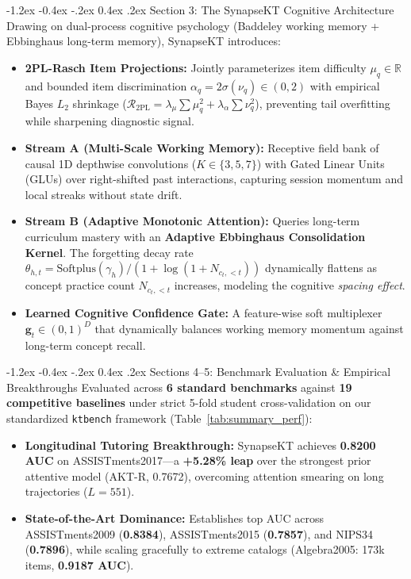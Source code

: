 \documentclass[10.5pt,a4paper]{article}
\makeatletter
\renewcommand{\subsection}{\@startsection{subsection}{2}{\z@}%
  {-1.2ex \@plus -0.4ex \@minus -.2ex}%
  {0.4ex \@plus .2ex}%
  {\normalfont\normalsize\bfseries\color{black}}}
\makeatother
\begin{document}
\subsection{Section 3: The SynapseKT Cognitive Architecture}
Drawing on dual-process cognitive psychology (Baddeley working memory + Ebbinghaus long-term memory), SynapseKT introduces:
\begin{itemize}\setlength{\itemsep}{1.5pt}\setlength{\parskip}{0pt}\setlength{\topsep}{0pt}\setlength{\partopsep}{0pt}
    \item \textbf{2PL-Rasch Item Projections:} Jointly parameterizes item difficulty $\mu_q \in \mathbb{R}$ and bounded item discrimination $\alpha_q = 2\sigma(\nu_q) \in (0, 2)$ with empirical Bayes $L_2$ shrinkage ($\mathcal{R}_{\text{2PL}} = \lambda_\mu \sum \mu_q^2 + \lambda_\alpha \sum \nu_q^2$), preventing tail overfitting while sharpening diagnostic signal.
    \item \textbf{Stream A (Multi-Scale Working Memory):} Receptive field bank of causal 1D depthwise convolutions ($K \in \{3, 5, 7\}$) with Gated Linear Units (GLUs) over right-shifted past interactions, capturing session momentum and local streaks without state drift.
    \item \textbf{Stream B (Adaptive Monotonic Attention):} Queries long-term curriculum mastery with an \textbf{Adaptive Ebbinghaus Consolidation Kernel}. The forgetting decay rate $\theta_{h, t} = \text{Softplus}(\gamma_h) / (1 + \log(1 + N_{c_t, <t}))$ dynamically flattens as concept practice count $N_{c_t, <t}$ increases, modeling the cognitive \textit{spacing effect}.
    \item \textbf{Learned Cognitive Confidence Gate:} A feature-wise soft multiplexer $\mathbf{g}_t \in (0, 1)^D$ that dynamically balances working memory momentum against long-term concept recall.
\end{itemize}

\subsection{Sections 4--5: Benchmark Evaluation \& Empirical Breakthroughs}
Evaluated across \textbf{6 standard benchmarks} against \textbf{19 competitive baselines} under strict 5-fold student cross-validation on our standardized \texttt{ktbench} framework (Table~\ref{tab:summary_perf}):
\begin{itemize}\setlength{\itemsep}{1.5pt}\setlength{\parskip}{0pt}\setlength{\topsep}{0pt}\setlength{\partopsep}{0pt}
    \item \textbf{Longitudinal Tutoring Breakthrough:} SynapseKT achieves \textbf{0.8200 AUC} on ASSISTments2017—a \textbf{+5.28\% leap} over the strongest prior attentive model (AKT-R, 0.7672), overcoming attention smearing on long trajectories ($L=551$).
    \item \textbf{State-of-the-Art Dominance:} Establishes top AUC across ASSISTments2009 (\textbf{0.8384}), ASSISTments2015 (\textbf{0.7857}), and NIPS34 (\textbf{0.7896}), while scaling gracefully to extreme catalogs (Algebra2005: 173k items, \textbf{0.9187 AUC}).
\end{itemize}
\end{document}
